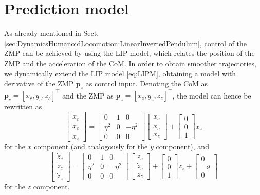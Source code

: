 \section{Prediction model}
As already mentioned in Sect. \ref{sec:DynamicsHumanoidLocomotion:LinearInvertedPendulum},
control of the ZMP can be achieved by using the LIP model, which relates the 
position of the ZMP and the acceleration of the CoM. In order to obtain smoother
trajectories, we dynamically extend the LIP model \eqref{eq:LIPM}, obtaining a
model with derivative of the ZMP $\dot{\bm{p}}_z$ as control input. Denoting
the CoM as $\bm{p}_c = [x_c, y_c, z_c]^\top$ and the ZMP as $\bm{p}_z = [x_z, y_z, z_z]^\top$, the 
model can hence be rewritten as
\begin{equation}
    \label{eq:LIPM-x-dynamic-extension}
    \begin{bmatrix}
        \dot{x}_c \\ \ddot{x}_c \\ \dot{x}_z 
    \end{bmatrix}
    =
    \begin{bmatrix}
        0 & 1 & 0 \\ 
        \eta^2 & 0 & -\eta^2 \\
        0 & 0 & 0
    \end{bmatrix}
    \begin{bmatrix}
        x_c \\ \dot{x}_c \\ x_z 
    \end{bmatrix}
    +
    \begin{bmatrix}
        0 \\ 0 \\ 1
    \end{bmatrix}
    \dot{x}_z
\end{equation}
for the $x$ component (and analogously for the $y$ component), and
\begin{equation}
    \label{eq:LIPM-z-dynamic-extension}
    \begin{bmatrix}
        \dot{z}_c \\ \ddot{z}_c \\ \dot{z}_z 
    \end{bmatrix}
    =
    \begin{bmatrix}
        0 & 1 & 0 \\ 
        \eta^2 & 0 & -\eta^2 \\
        0 & 0 & 0
    \end{bmatrix}
    \begin{bmatrix}
        z_c \\ \dot{z}_c \\ z_z 
    \end{bmatrix}
    +
    \begin{bmatrix}
        0 \\ 0 \\ 1
    \end{bmatrix}
    \dot{z}_z
    +
    \begin{bmatrix}
        0 \\ -g \\ 0
    \end{bmatrix}
\end{equation}
for the $z$ component.


